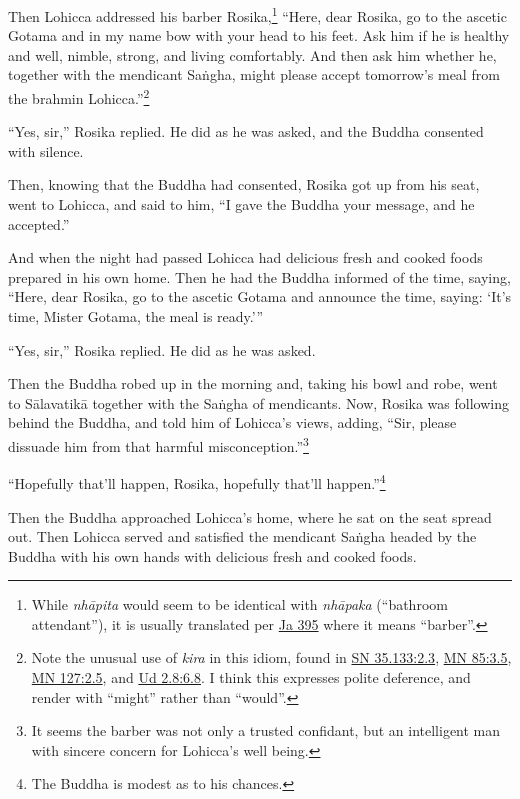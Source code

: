 \documentclass[12pt,openany]{book}%
\begin{document}
Then Lohicca addressed his barber Rosika,\footnote{While \textit{\textsanskrit{nhāpita}} would seem to be identical with \textit{\textsanskrit{nhāpaka}} (“bathroom attendant”), it is usually translated per \href{https://suttacentral.net/ja395/en/sujato}{Ja 395} where it means “barber”. } “Here, dear Rosika, go to the ascetic Gotama and in my name bow with your head to his feet. Ask him if he is healthy and well, nimble, strong, and living comfortably. And then ask him whether he, together with the mendicant \textsanskrit{Saṅgha}, might please accept tomorrow’s meal from the brahmin Lohicca.”\footnote{Note the unusual use of \textit{kira} in this idiom, found in \href{https://suttacentral.net/sn35.133/en/sujato\#2.3}{SN 35.133:2.3}, \href{https://suttacentral.net/mn85/en/sujato\#3.5}{MN 85:3.5}, \href{https://suttacentral.net/mn127/en/sujato\#2.5}{MN 127:2.5}, and \href{https://suttacentral.net/ud2.8/en/sujato\#6.8}{Ud 2.8:6.8}. I think this expresses polite deference, and render with “might” rather than “would”. } 

“Yes, sir,” Rosika replied. He did as he was asked, and the Buddha consented with silence. 

Then, knowing that the Buddha had consented, Rosika got up from his seat, went to Lohicca, and said to him, “I gave the Buddha your message, and he accepted.” 

And when the night had passed Lohicca had delicious fresh and cooked foods prepared in his own home. Then he had the Buddha informed of the time, saying, “Here, dear Rosika, go to the ascetic Gotama and announce the time, saying: ‘It’s time, Mister Gotama, the meal is ready.’” 

“Yes, sir,” Rosika replied. He did as he was asked. 

Then the Buddha robed up in the morning and, taking his bowl and robe, went to \textsanskrit{Sālavatikā} together with the \textsanskrit{Saṅgha} of mendicants. Now, Rosika was following behind the Buddha, and told him of Lohicca’s views, adding, “Sir, please dissuade him from that harmful misconception.”\footnote{It seems the barber was not only a trusted confidant, but an intelligent man with sincere concern for Lohicca’s well being. } 

“Hopefully that’ll happen, Rosika, hopefully that’ll happen.”\footnote{The Buddha is modest as to his chances. } 

Then the Buddha approached Lohicca’s home, where he sat on the seat spread out. Then Lohicca served and satisfied the mendicant \textsanskrit{Saṅgha} headed by the Buddha with his own hands with delicious fresh and cooked foods. 
\end{document}

